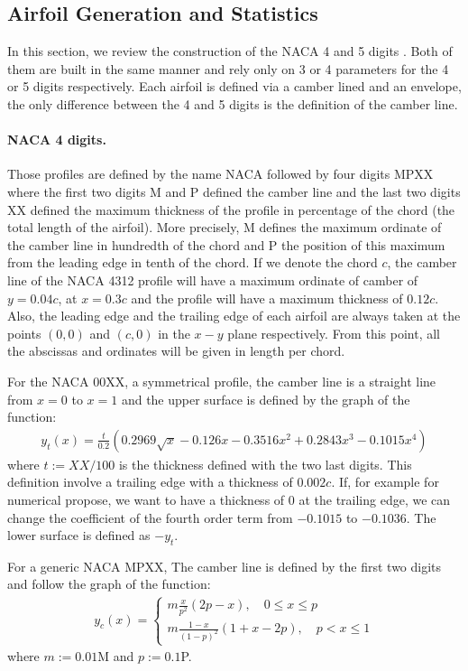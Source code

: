 \begin{subappendices}
	\section{Airfoil Generation and Statistics}\label{ap:airfoil}
	In this section, we review the construction of the \acrshort{NACA} 4 and 5 digits \cite{naca}. Both of them are built in the same manner and rely only on 3 or 4 parameters for the 4 or 5 digits respectively. Each airfoil is defined via a camber lined and an envelope, the only difference between the 4 and 5 digits is the definition of the camber line.
	
	\paragraph{NACA 4 digits.} Those profiles are defined by the name \acrshort{NACA} followed by four digits MPXX where the first two digits M and P defined the camber line and the last two digits XX defined the maximum thickness of the profile in percentage of the chord (the total length of the airfoil). More precisely, M defines the maximum ordinate of the camber line in hundredth of the chord and P the position of this maximum from the leading edge in tenth of the chord. If we denote the chord $c$, the camber line of the \acrshort{NACA} 4312 profile will have a maximum ordinate of camber of $y = 0.04c$, at $x = 0.3c$ and the profile will have a maximum thickness of $0.12c$. Also, the leading edge and the trailing edge of each airfoil are always taken at the points $(0, 0)$ and $(c, 0)$ in the $x-y$ plane respectively. From this point, all the abscissas and ordinates will be given in length per chord.
	
	For the \acrshort{NACA} 00XX, a symmetrical profile, the camber line is a straight line from $x = 0$ to $x = 1$ and the upper surface is defined by the graph of the function:
	\begin{align}
		y_t(x) = \frac{t}{0.2}\left(0.2969\sqrt{x} - 0.126x - 0.3516x^2 + 0.2843x^3 - 0.1015x^4\right)
	\end{align}
	where $t := XX/100$ is the thickness defined with the two last digits. This definition involve a trailing edge with a thickness of $0.002c$. If, for example for numerical propose, we want to have a thickness of 0 at the trailing edge, we can change the coefficient of the fourth order term from $-0.1015$ to $-0.1036$. The lower surface is defined as $-y_t$.
	
	For a generic \acrshort{NACA} MPXX, The camber line is defined by the first two digits and follow the graph of the function:
	\begin{align}
		y_c(x) =
		\begin{cases}
			m\frac{x}{p^2}(2p - x), \quad 0 \leqslant x\leqslant p \\
			m\frac{1 - x}{(1-p)^2}(1 + x - 2p), \quad p < x \leqslant 1
		\end{cases}
	\end{align}
	where $m := 0.01$M and $p:= 0.1$P.
	

\end{subappendices}
